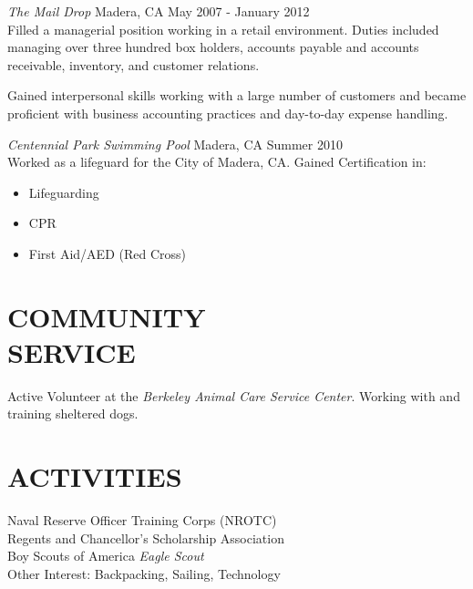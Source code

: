 \documentclass[margin]{res}
\begin{document}
\begin{resume}
{\sl The Mail Drop} Madera, CA \hfill May 2007 - January 2012 \\ 
                Filled a managerial position working in a retail environment.  Duties included managing over three hundred box holders, accounts payable and accounts receivable, inventory, and customer relations.
                 
Gained interpersonal skills working with a large number of customers and became proficient with business accounting practices and day-to-day expense handling.
 
                {\sl Centennial Park Swimming Pool} Madera, CA \hfill            Summer 2010             \\              
               Worked as a lifeguard for the City of Madera, CA.
               Gained Certification in:
                 \begin{itemize}  \itemsep -2pt %
                 \item Lifeguarding
                 \item CPR 
                 \item First Aid/AED (Red Cross)
                 \end{itemize} 
                
 
\section{COMMUNITY \\ SERVICE}  Active Volunteer at the \emph{Berkeley Animal Care Service Center}. \newline Working with and training sheltered dogs.

\section{ACTIVITIES}             
            Naval Reserve Officer Training Corps (NROTC) \\
            Regents and Chancellor's Scholarship Association\\
            Boy Scouts of America \emph{Eagle Scout} \\
            Other Interest: Backpacking, Sailing, Technology
            
            
 

\end{resume}
\end{document}
